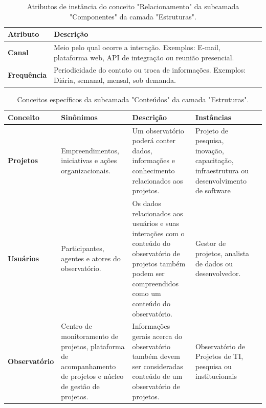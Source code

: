 \begin{apendicesenv}
\begin{table}[H]
\centering
\caption{Atributos de instância do conceito "Relacionamento" da subcamada "Componentes" da camada "Estruturas".}
\begin{tabularx}{\textwidth}{|l|X|X|}
\hline
\textbf{Atributo} & \textbf{Descrição} \\ \hline
\textbf{Canal} & Meio pelo qual ocorre a interação. Exemplos: E-mail, plataforma web, API de integração ou reunião presencial. \\ \hline
\textbf{Frequência} & Periodicidade do contato ou troca de informações. Exemplos: Diária, semanal, mensal, sob demanda. \\ \hline
\end{tabularx}
\end{table}

\begin{table}[H]
\centering
\caption{Conceitos específicos da subcamada "Conteúdos" da camada "Estruturas".}
\begin{tabularx}{\textwidth}{|l|X|X|X|X|}
\hline
\textbf{Conceito} & \textbf{Sinônimos} & \textbf{Descrição} & \textbf{Instâncias} \\ \hline
\textbf{Projetos}   & Empreendimentos, iniciativas e ações organizacionais. & Um observatório poderá conter dados, informações e conhecimento relacionados aos projetos. & Projeto de pesquisa, inovação, capacitação, infraestrutura ou desenvolvimento de software  \\ \hline
\textbf{Usuários}  & Participantes, agentes e atores do observatório. & Os dados relacionados aos usuários e suas interações com o conteúdo do observatório de projetos também podem ser compreendidos como um conteúdo do observatório. & Gestor de projetos, analista de dados ou desenvolvedor. \\ \hline
\textbf{Observatório}   & Centro de monitoramento de projetos, plataforma de acompanhamento de projetos e núcleo de gestão de projetos. & Informações gerais acerca do observatório também devem ser consideradas conteúdo de um observatório de projetos. & Observatório de Projetos de TI, pesquisa ou institucionais \\ \hline
\end{tabularx}
\end{table}


\end{apendicesenv}
